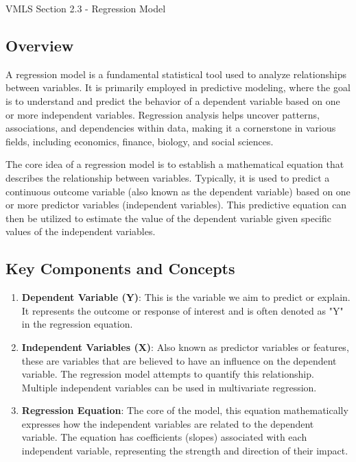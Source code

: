 \begin{notes}{VMLS Section 2.3 - Regression Model}
    \subsection*{Overview}

    A regression model is a fundamental statistical tool used to analyze relationships between variables. It is primarily employed in predictive modeling, where the goal is to understand and predict the behavior of a dependent variable based on 
    one or more independent variables. Regression analysis helps uncover patterns, associations, and dependencies within data, making it a cornerstone in various fields, including economics, finance, biology, and social sciences.
    
    The core idea of a regression model is to establish a mathematical equation that describes the relationship between variables. Typically, it is used to predict a continuous outcome variable (also known as the dependent variable) based on one 
    or more predictor variables (independent variables). This predictive equation can then be utilized to estimate the value of the dependent variable given specific values of the independent variables.
    
    \subsection*{Key Components and Concepts}
    
    \begin{enumerate}
        \item \textbf{Dependent Variable (Y)}: This is the variable we aim to predict or explain. It represents the outcome or response of interest and is often denoted as "Y" in the regression equation.
        
        \item \textbf{Independent Variables (X)}: Also known as predictor variables or features, these are variables that are believed to have an influence on the dependent variable. The regression model attempts to quantify this relationship. 
        Multiple independent variables can be used in multivariate regression.
        
        \item \textbf{Regression Equation}: The core of the model, this equation mathematically expresses how the independent variables are related to the dependent variable. The equation has coefficients (slopes) associated with each independent 
        variable, representing the strength and direction of their impact.
        

\end{enumerate}
\end{notes}
